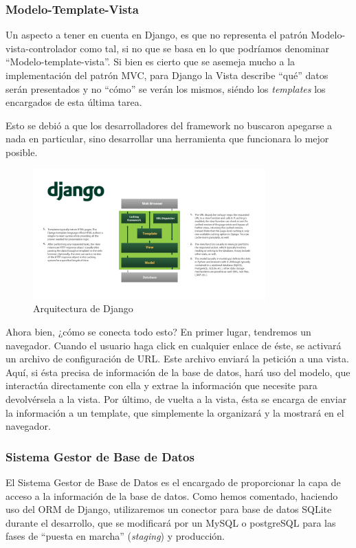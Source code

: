 \subsubsection{Modelo-Template-Vista}
Un aspecto a tener en cuenta en Django, es que no representa el patrón Modelo-vista-controlador como tal, si no que se basa en lo que podríamos denominar ``Modelo-template-vista''. Si bien es cierto que se asemeja mucho a la implementación del patrón MVC, para Django la Vista describe ``qué'' datos serán presentados y no ``cómo'' se verán los mismos, siéndo los \textit{templates} los encargados de esta última tarea.

Esto se debió a que los desarrolladores del framework no buscaron apegarse a nada en particular, sino desarrollar una herramienta que funcionara lo mejor posible.

\begin{figure}[H]
  \begin{center}
  \includegraphics[width=0.8\textwidth]{../images/django_arch.png}
  \caption{Arquitectura de Django}
  \label{fig:django_arch}
  \end{center}
\end{figure}

Ahora bien, ¿cómo se conecta todo esto? En primer lugar, tendremos un navegador. Cuando el usuario haga click en cualquier enlace de éste, se activará un archivo de configuración de URL. Este archivo enviará la petición a una vista. Aquí, si ésta precisa de información de la base de datos, hará uso del modelo, que interactúa directamente con ella y extrae la información que necesite para devolvérsela a la vista. Por último, de vuelta a la vista, ésta se encarga de enviar la información a un template, que simplemente la organizará y la mostrará en el navegador.

\subsubsection{Sistema Gestor de Base de Datos}
El Sistema Gestor de Base de Datos es el encargado de proporcionar la capa de acceso a la información de la base de datos. Como hemos comentado, haciendo uso del ORM de Django, utilizaremos un conector para base de datos SQLite durante el desarrollo, que se modificará por un MySQL o postgreSQL para las fases de ``puesta en marcha'' (\textit{staging}) y producción.

